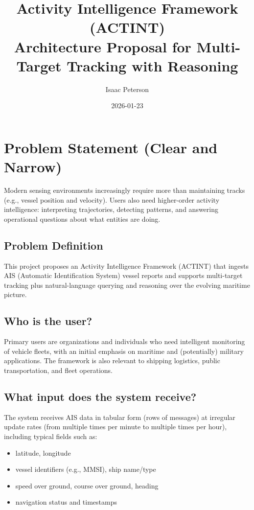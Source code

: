 \documentclass[11pt]{article}
\title{\vspace{-1.0em}Activity Intelligence Framework (ACTINT)\\Architecture Proposal for Multi-Target Tracking with Reasoning}
\author{Isaac Peterson}
\date{2026-01-23}
\begin{document}
\maketitle
\vspace{-1.0em}

\section{Problem Statement (Clear and Narrow)}
Modern sensing environments increasingly require more than maintaining tracks (e.g., vessel position and velocity). Users also need higher-order activity intelligence: interpreting trajectories, detecting patterns, and answering operational questions about what entities are doing.

\subsection*{Problem Definition}
This project proposes an Activity Intelligence Framework (ACTINT) that ingests AIS (Automatic Identification System) vessel reports and supports multi-target tracking plus natural-language querying and reasoning over the evolving maritime picture.

\subsection*{Who is the user?}
Primary users are organizations and individuals who need intelligent monitoring of vehicle fleets, with an initial emphasis on maritime and (potentially) military applications. The framework is also relevant to shipping logistics, public transportation, and fleet operations.

\subsection*{What input does the system receive?}
The system receives AIS data in tabular form (rows of messages) at irregular update rates (from multiple times per minute to multiple times per hour), including typical fields such as:
\begin{itemize}
  \item latitude, longitude
  \item vessel identifiers (e.g., MMSI), ship name/type
  \item speed over ground, course over ground, heading
  \item navigation status and timestamps
\end{itemize}
\end{document}
